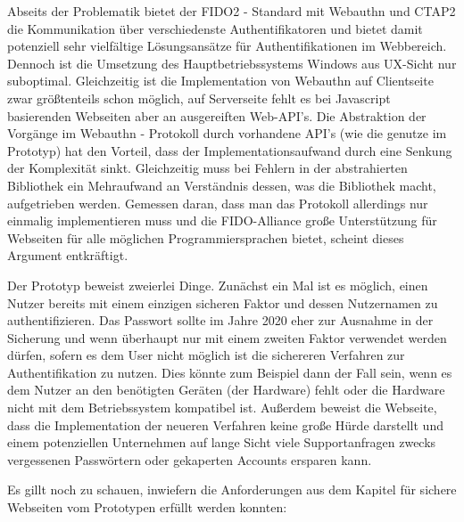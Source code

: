 Abseits der Problematik bietet der FIDO2 - Standard mit Webauthn und CTAP2 die Kommunikation über verschiedenste Authentifikatoren und bietet damit potenziell sehr vielfältige Lösungsansätze für Authentifikationen im Webbereich.
Dennoch ist die Umsetzung des Hauptbetriebssystems Windows aus UX-Sicht nur suboptimal. Gleichzeitig ist die Implementation von Webauthn auf Clientseite zwar größtenteils schon möglich, auf Serverseite fehlt es bei Javascript basierenden Webseiten aber an ausgereiften Web-API's. Die Abstraktion der Vorgänge im Webauthn - Protokoll durch vorhandene API's (wie die genutze im Prototyp) hat den Vorteil, dass der Implementationsaufwand durch eine Senkung der Komplexität sinkt. Gleichzeitig muss bei Fehlern in der abstrahierten Bibliothek ein Mehraufwand an Verständnis dessen, was die Bibliothek macht, aufgetrieben werden. Gemessen daran, dass man das Protokoll allerdings nur einmalig implementieren muss und die FIDO-Alliance große Unterstützung für Webseiten für alle möglichen Programmiersprachen bietet, scheint dieses Argument entkräftigt.

Der Prototyp beweist zweierlei Dinge. Zunächst ein Mal ist es möglich, einen Nutzer bereits mit einem einzigen sicheren Faktor und dessen Nutzernamen zu authentifizieren. Das Passwort sollte im Jahre 2020 eher zur Ausnahme in der Sicherung und wenn überhaupt nur mit einem zweiten Faktor verwendet werden dürfen, sofern es dem User nicht möglich ist die sichereren Verfahren zur Authentifikation zu nutzen. Dies könnte zum Beispiel dann der Fall sein, wenn es dem Nutzer an den benötigten Geräten (der Hardware) fehlt oder die Hardware nicht mit dem Betriebssystem kompatibel ist. Außerdem beweist die Webseite, dass die Implementation der neueren Verfahren keine große Hürde darstellt und einem potenziellen Unternehmen auf lange Sicht viele Supportanfragen zwecks vergessenen Passwörtern oder gekaperten Accounts ersparen kann.

Es gillt noch zu schauen, inwiefern die Anforderungen aus dem Kapitel für sichere Webseiten vom Prototypen erfüllt werden konnten:

